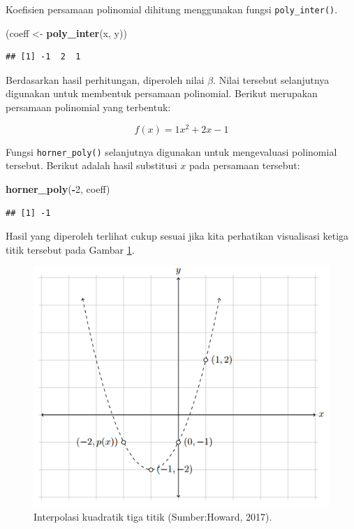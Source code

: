 \documentclass[
]{book}
\newenvironment{Shaded}{\begin{snugshade}}{\end{snugshade}}
\newcommand{\DecValTok}[1]{\textcolor[rgb]{0.00,0.00,0.81}{#1}}
\newcommand{\FunctionTok}[1]{\textcolor[rgb]{0.13,0.29,0.53}{\textbf{#1}}}
\newcommand{\NormalTok}[1]{#1}
\newcommand{\OtherTok}[1]{\textcolor[rgb]{0.56,0.35,0.01}{#1}}
\newcommand{\SpecialCharTok}[1]{\textcolor[rgb]{0.81,0.36,0.00}{\textbf{#1}}}
\theoremstyle{definition}
\theoremstyle{definition}
\theoremstyle{definition}
\theoremstyle{definition}
\theoremstyle{remark}
\begin{document}
Koefisien persamaan polinomial dihitung menggunakan fungsi \texttt{poly\_inter()}.

\begin{Shaded}
\begin{Highlighting}[]
\NormalTok{(coeff }\OtherTok{\textless{}{-}} \FunctionTok{poly\_inter}\NormalTok{(x, y))}
\end{Highlighting}
\end{Shaded}

\begin{verbatim}
## [1] -1  2  1
\end{verbatim}

Berdasarkan hasil perhitungan, diperoleh nilai \(\beta\). Nilai tersebut selanjutnya digunakan untuk membentuk persamaan polinomial. Berikut merupakan persamaan polinomial yang terbentuk:

\[
f\left(x\right)=1x^2+2x-1
\]

Fungsi \texttt{horner\_poly()} selanjutnya digunakan untuk mengevaluasi polinomial tersebut. Berikut adalah hasil substitusi \(x\) pada persamaan tersebut:

\begin{Shaded}
\begin{Highlighting}[]
\FunctionTok{horner\_poly}\NormalTok{(}\SpecialCharTok{{-}}\DecValTok{2}\NormalTok{, coeff)}
\end{Highlighting}
\end{Shaded}

\begin{verbatim}
## [1] -1
\end{verbatim}

Hasil yang diperoleh terlihat cukup sesuai jika kita perhatikan visualisasi ketiga titik tersebut pada Gambar \ref{fig:hopoliviz}.

\begin{figure}

{\centering \includegraphics[width=0.8\linewidth]{./images/hopoliviz} 

}

\caption{Interpolasi kuadratik tiga titik 
(Sumber:Howard, 2017).}\label{fig:hopoliviz}
\end{figure}
\end{document}
